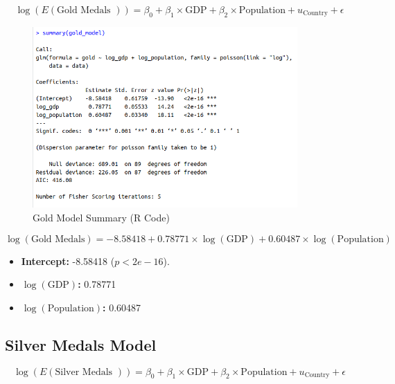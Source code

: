 \documentclass[a4paper,12pt]{article}
\begin{document}
\[
\log(E(\text{Gold Medals })) = \beta_0 + \beta_1 \times \text{GDP} + \beta_2 \times \text{Population} + u_{\text{Country}} + \epsilon
\]




\begin{figure}[H]
	\centering
	\includegraphics[width=0.9\textwidth]{images/Gold_Model.png}
	\caption{Gold Model Summary (R Code)}
	\label{fig:dataset_fig_10}
\end{figure}





\[
\log(\text{Gold Medals}) = -8.58418 + 0.78771 \times \log(\text{GDP}) + 0.60487 \times \log(\text{Population})
\]
\begin{itemize}
	\item \textbf{Intercept:} -8.58418 (\(p < 2e-16\)).
	\item \textbf{\(\log(\text{GDP})\):} 0.78771 
	\item \textbf{\(\log(\text{Population})\):} 0.60487 
\end{itemize}





\subsection{Silver Medals Model}

\[
\log(E(\text{Silver Medals })) = \beta_0 + \beta_1 \times \text{GDP} + \beta_2 \times \text{Population} + u_{\text{Country}} + \epsilon
\]
\end{document}
